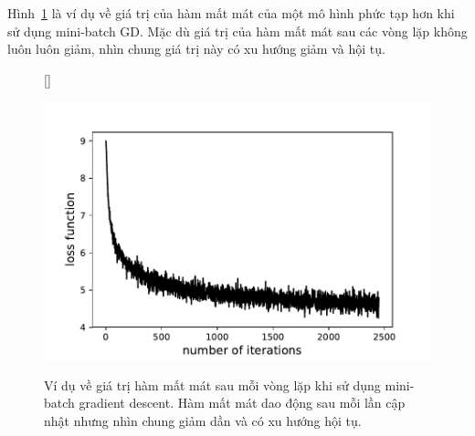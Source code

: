 Hình~\ref{fig:7_minibatch} là ví dụ về giá trị của hàm mất mát của một mô hình
phức tạp hơn khi sử dụng mini-batch GD. Mặc dù giá trị của hàm mất mát sau các
vòng lặp không luôn luôn giảm, nhìn chung giá trị này có xu hướng giảm và hội
tụ.

\begin{figure}[t]
   
    [\FBwidth]
    {\caption{ 
    Ví dụ về giá trị hàm mất mát sau mỗi vòng lặp khi sử dụng mini-batch
    gradient descent.
    Hàm mất mát dao động sau mỗi lần cập
    nhật nhưng nhìn chung giảm dần và có xu hướng hội tụ.
    }
    \label{fig:7_minibatch}}
    { %
    \includegraphics[width=.65\textwidth]{ebookML_src/src/multiclasssvm/loss_history.pdf}
    }
\end{figure}
 
 
 
 




